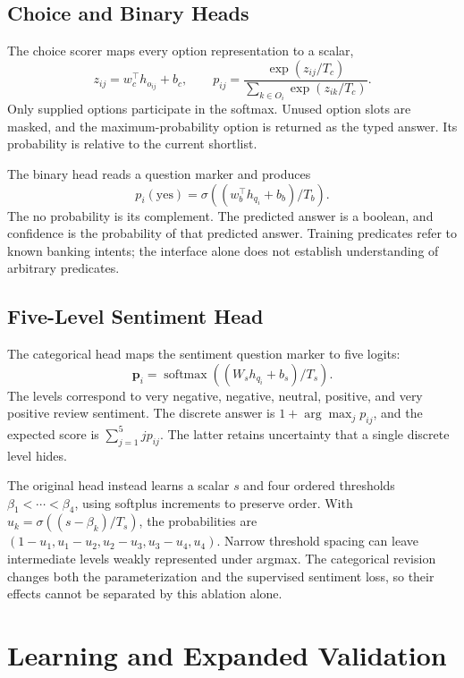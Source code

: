\documentclass[conference]{IEEEtran}
\begin{document}
\subsection{Choice and Binary Heads}
The choice scorer maps every option representation to a scalar,
\begin{equation}
z_{ij}=w_c^\top h_{o_{ij}}+b_c,\qquad
p_{ij}=\frac{\exp(z_{ij}/T_c)}{\sum_{k\in O_i}\exp(z_{ik}/T_c)}.
\end{equation}
Only supplied options participate in the softmax. Unused option slots are masked, and the maximum-probability option is returned as the typed answer. Its probability is relative to the current shortlist.

The binary head reads a question marker and produces
\begin{equation}
p_i(\mathrm{yes})=\sigma((w_b^\top h_{q_i}+b_b)/T_b).
\end{equation}
The no probability is its complement. The predicted answer is a boolean, and confidence is the probability of that predicted answer. Training predicates refer to known banking intents; the interface alone does not establish understanding of arbitrary predicates.

\subsection{Five-Level Sentiment Head}
The categorical head maps the sentiment question marker to five logits:
\begin{equation}
\boldsymbol{p}_i=\operatorname{softmax}((W_s h_{q_i}+b_s)/T_s).
\end{equation}
The levels correspond to very negative, negative, neutral, positive, and very positive review sentiment. The discrete answer is $1+\arg\max_j p_{ij}$, and the expected score is $\sum_{j=1}^{5}j p_{ij}$. The latter retains uncertainty that a single discrete level hides.

The original head instead learns a scalar $s$ and four ordered thresholds $\beta_1<\cdots<\beta_4$, using softplus increments to preserve order. With $u_k=\sigma((s-\beta_k)/T_s)$, the probabilities are $(1-u_1,u_1-u_2,u_2-u_3,u_3-u_4,u_4)$. Narrow threshold spacing can leave intermediate levels weakly represented under argmax. The categorical revision changes both the parameterization and the supervised sentiment loss, so their effects cannot be separated by this ablation alone.

\section{Learning and Expanded Validation}
\end{document}
